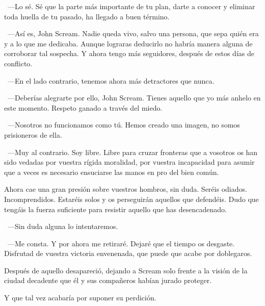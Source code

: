~---Lo sé. Sé que la parte más importante de tu plan, darte a conocer y eliminar toda huella de tu pasado, ha llegado a buen término.

~---Así es, John Scream. Nadie queda vivo, salvo una persona, que sepa quién era y a lo que me dedicaba. Aunque lograras deducirlo no habría manera alguna de corroborar tal sospecha. Y ahora tengo más seguidores, después de estos días de conflicto.

~---En el lado contrario, tenemos ahora más detractores que nunca.

~---Deberías alegrarte por ello, John Scream. Tienes aquello que yo más anhelo en este momento. Respeto ganado a través del miedo.

~---Nosotros no funcionamos como tú. Hemos creado una imagen, no somos prisioneros de ella.

~---Muy al contrario. Soy libre. Libre para cruzar fronteras que a vosotros os han sido vedadas por vuestra rígida moralidad, por vuestra incapacidad para asumir que a veces es necesario ensuciarse las manos en pro del bien común.

\rquoti Ahora cae una gran presión sobre vuestros hombros, sin duda. Seréis odiados. Incomprendidos. Estaréis solos y os perseguirán aquellos que defendéis. Dudo que tengáis la fuerza suficiente para resistir aquello que has desencadenado.

~---Sin duda alguna lo intentaremos.

~---Me consta. Y por ahora me retiraré. Dejaré que el tiempo os desgaste. Disfrutad de vuestra victoria envenenada, que puede que acabe por doblegaros.

Después de aquello desapareció, dejando a Scream solo frente a la visión de la ciudad decadente que él y sus compañeros habían jurado proteger.

Y que tal vez acabaría por suponer su perdición.

\endinput
